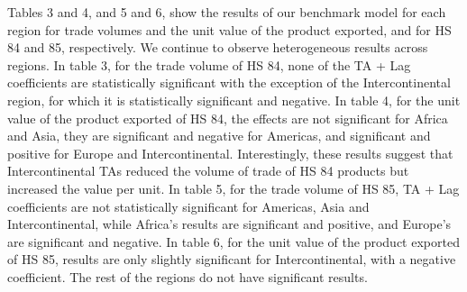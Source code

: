 \documentclass[12pt]{article}%
\begin{document}
Tables 3 and 4, and 5 and 6, show the results of our benchmark model for
each region for trade volumes and the unit value of the product
exported, and for HS 84 and 85, respectively. We continue to observe
heterogeneous results across regions. In table 3, for the trade volume
of HS 84, none of the TA + Lag coefficients are statistically
significant with the exception of the Intercontinental region, for which
it is statistically significant and negative. In table 4, for the unit
value of the product exported of HS 84, the effects are not significant
for Africa and Asia, they are significant and negative for Americas, and
significant and positive for Europe and Intercontinental. Interestingly,
these results suggest that Intercontinental TAs reduced the volume of
trade of HS 84 products but increased the value per unit. In table 5,
for the trade volume of HS 85, TA + Lag coefficients are not
statistically significant for Americas, Asia and Intercontinental, while
Africa's results are significant and positive, and Europe's are
significant and negative. In table 6, for the unit value of the product
exported of HS 85, results are only slightly significant for
Intercontinental, with a negative coefficient. The rest of the regions
do not have significant results.
\end{document}
